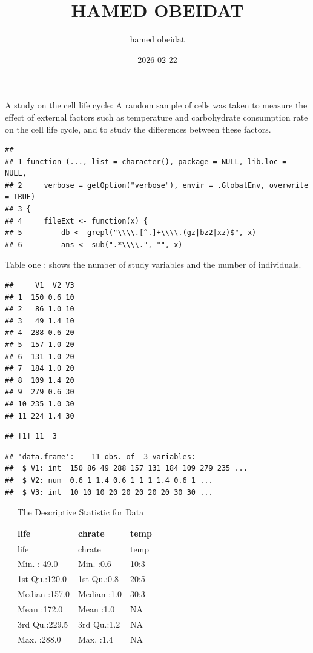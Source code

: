 \documentclass[
]{article}
\title{HAMED OBEIDAT}
\author{hamed obeidat}
\date{2026-02-22}
\begin{document}
\maketitle

A study on the cell life cycle: A random sample of cells was taken to
measure the effect of external factors such as temperature and
carbohydrate consumption rate on the cell life cycle, and to study the
differences between these factors.

\begin{verbatim}
##                                                                             
## 1 function (..., list = character(), package = NULL, lib.loc = NULL,        
## 2     verbose = getOption("verbose"), envir = .GlobalEnv, overwrite = TRUE) 
## 3 {                                                                         
## 4     fileExt <- function(x) {                                              
## 5         db <- grepl("\\\\.[^.]+\\\\.(gz|bz2|xz)$", x)                     
## 6         ans <- sub(".*\\\\.", "", x)
\end{verbatim}

Table one : shows the number of study variables and the number of
individuals.

\begin{verbatim}
##     V1  V2 V3
## 1  150 0.6 10
## 2   86 1.0 10
## 3   49 1.4 10
## 4  288 0.6 20
## 5  157 1.0 20
## 6  131 1.0 20
## 7  184 1.0 20
## 8  109 1.4 20
## 9  279 0.6 30
## 10 235 1.0 30
## 11 224 1.4 30
\end{verbatim}

\begin{verbatim}
## [1] 11  3
\end{verbatim}

\begin{verbatim}
## 'data.frame':    11 obs. of  3 variables:
##  $ V1: int  150 86 49 288 157 131 184 109 279 235 ...
##  $ V2: num  0.6 1 1.4 0.6 1 1 1 1.4 0.6 1 ...
##  $ V3: int  10 10 10 20 20 20 20 20 30 30 ...
\end{verbatim}

\begin{longtable}[]{@{}llll@{}}
\caption{The Descriptive Statistic for Data}\tabularnewline
\toprule\noalign{}
& life & chrate & temp \\
\midrule\noalign{}
\endfirsthead
\toprule\noalign{}
& life & chrate & temp \\
\midrule\noalign{}
\endhead
\bottomrule\noalign{}
\endlastfoot
& Min. : 49.0 & Min. :0.6 & 10:3 \\
& 1st Qu.:120.0 & 1st Qu.:0.8 & 20:5 \\
& Median :157.0 & Median :1.0 & 30:3 \\
& Mean :172.0 & Mean :1.0 & NA \\
& 3rd Qu.:229.5 & 3rd Qu.:1.2 & NA \\
& Max. :288.0 & Max. :1.4 & NA \\
\end{longtable}
\end{document}
